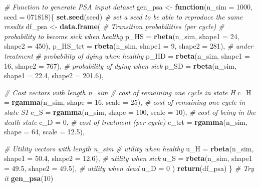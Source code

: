 \documentclass[
]{article}
\newenvironment{Shaded}{\begin{snugshade}}{\end{snugshade}}
\newcommand{\CommentTok}[1]{\textcolor[rgb]{0.56,0.35,0.01}{\textit{#1}}}
\newcommand{\ControlFlowTok}[1]{\textcolor[rgb]{0.13,0.29,0.53}{\textbf{#1}}}
\newcommand{\DataTypeTok}[1]{\textcolor[rgb]{0.13,0.29,0.53}{#1}}
\newcommand{\DecValTok}[1]{\textcolor[rgb]{0.00,0.00,0.81}{#1}}
\newcommand{\FloatTok}[1]{\textcolor[rgb]{0.00,0.00,0.81}{#1}}
\newcommand{\KeywordTok}[1]{\textcolor[rgb]{0.13,0.29,0.53}{\textbf{#1}}}
\newcommand{\NormalTok}[1]{#1}
\newcommand{\StringTok}[1]{\textcolor[rgb]{0.31,0.60,0.02}{#1}}
\begin{document}
\begin{Shaded}
\begin{Highlighting}[]
\CommentTok{# Function to generate PSA input dataset}
\NormalTok{gen_psa <-}\StringTok{ }\ControlFlowTok{function}\NormalTok{(}\DataTypeTok{n_sim =} \DecValTok{1000}\NormalTok{, }\DataTypeTok{seed =} \DecValTok{071818}\NormalTok{)\{}
  \KeywordTok{set.seed}\NormalTok{(seed) }\CommentTok{# set a seed to be able to reproduce the same results}
\NormalTok{  df_psa <-}\StringTok{ }\KeywordTok{data.frame}\NormalTok{(}
    \CommentTok{# Transition probabilities (per cycle)}
    \CommentTok{# probability to become sick when healthy}
    \DataTypeTok{p_HS     =} \KeywordTok{rbeta}\NormalTok{(n_sim, }\DataTypeTok{shape1 =} \DecValTok{24}\NormalTok{, }\DataTypeTok{shape2 =} \DecValTok{450}\NormalTok{), }
    \DataTypeTok{p_HS_trt =} \KeywordTok{rbeta}\NormalTok{(n_sim, }\DataTypeTok{shape1 =} \DecValTok{9}\NormalTok{,  }\DataTypeTok{shape2 =} \DecValTok{281}\NormalTok{),   }\CommentTok{# under treatment}
    \CommentTok{# probability of dying when healthy}
    \DataTypeTok{p_HD     =} \KeywordTok{rbeta}\NormalTok{(n_sim, }\DataTypeTok{shape1 =} \DecValTok{16}\NormalTok{, }\DataTypeTok{shape2 =} \DecValTok{767}\NormalTok{),}
    \CommentTok{# probability of dying when sick}
    \DataTypeTok{p_SD     =} \KeywordTok{rbeta}\NormalTok{(n_sim, }\DataTypeTok{shape1 =} \FloatTok{22.4}\NormalTok{, }\DataTypeTok{shape2 =} \FloatTok{201.6}\NormalTok{), }

    \CommentTok{# Cost vectors with length n_sim}
    \CommentTok{# cost of remaining one cycle in state H}
    \DataTypeTok{c_H      =} \KeywordTok{rgamma}\NormalTok{(n_sim, }\DataTypeTok{shape =} \DecValTok{16}\NormalTok{, }\DataTypeTok{scale =} \DecValTok{25}\NormalTok{), }
    \CommentTok{# cost of remaining one cycle in state S1}
    \DataTypeTok{c_S      =} \KeywordTok{rgamma}\NormalTok{(n_sim, }\DataTypeTok{shape =} \DecValTok{100}\NormalTok{, }\DataTypeTok{scale =} \DecValTok{10}\NormalTok{), }
    \CommentTok{# cost of being in the death state}
    \DataTypeTok{c_D      =} \DecValTok{0}\NormalTok{, }
    \CommentTok{# cost of treatment (per cycle)}
    \DataTypeTok{c_trt    =} \KeywordTok{rgamma}\NormalTok{(n_sim, }\DataTypeTok{shape =} \DecValTok{64}\NormalTok{, }\DataTypeTok{scale =} \FloatTok{12.5}\NormalTok{),}
    
    \CommentTok{# Utility vectors with length n_sim }
    \CommentTok{# utility when healthy}
    \DataTypeTok{u_H      =} \KeywordTok{rbeta}\NormalTok{(n_sim, }\DataTypeTok{shape1 =}  \FloatTok{50.4}\NormalTok{, }\DataTypeTok{shape2 =} \FloatTok{12.6}\NormalTok{), }
    \CommentTok{# utility when sick}
    \DataTypeTok{u_S      =} \KeywordTok{rbeta}\NormalTok{(n_sim, }\DataTypeTok{shape1 =} \FloatTok{49.5}\NormalTok{, }\DataTypeTok{shape2 =} \FloatTok{49.5}\NormalTok{), }
    \CommentTok{# utility when dead}
    \DataTypeTok{u_D      =} \DecValTok{0}                                              
\NormalTok{  )}
  \KeywordTok{return}\NormalTok{(df_psa)}
\NormalTok{\}}
\CommentTok{# Try it}
\KeywordTok{gen_psa}\NormalTok{(}\DecValTok{10}\NormalTok{) }
\end{Highlighting}
\end{Shaded}
\end{document}
